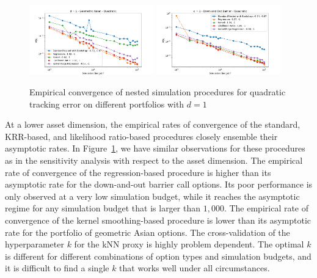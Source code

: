 \documentclass{article}
\begin{document}
\begin{figure}[ht!] 
    \centering
    \includegraphics[width=0.48\textwidth]{./figures/convergence/5203.png}
    \includegraphics[width=0.48\textwidth]{./figures/convergence/5403.png}
    \caption{Empirical convergence of nested simulation procedures for quadratic tracking error on different portfolios with $d=1$}
    \label{fig:5x03} 
\end{figure}

At a lower asset dimension, the empirical rates of convergence of the standard, KRR-based, and likelihood ratio-based procedures closely ensemble their asymptotic rates.
In Figure~\ref{fig:5x03}, we have similar observations for these procedures as in the sensitivity analysis with respect to the asset dimension.
The empirical rate of convergence of the regression-based procedure is higher than its asymptotic rate for the down-and-out barrier call options. 
Its poor performance is only observed at a very low simulation budget, while it reaches the asymptotic regime for any simulation budget that is larger than $1\!,\!000$.
The empirical rate of convergence of the kernel smoothing-based procedure is lower than its asymptotic rate for the portfolio of geometric Asian options.
The cross-validation of the hyperparameter $k$ for the kNN proxy is highly problem dependent. 
The optimal $k$ is different for different combinations of option types and simulation budgets, and it is difficult to find a single $k$ that works well under all circumstances. 
\end{document}
